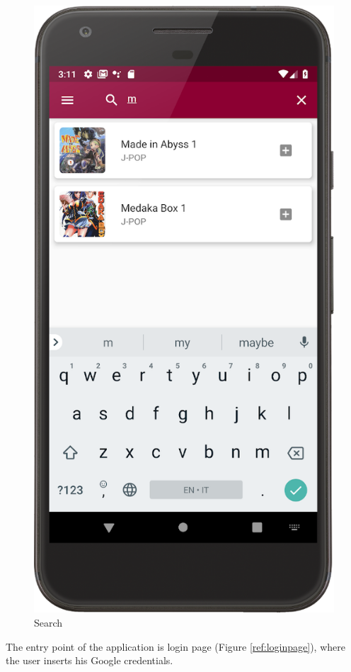 \begin{figure}[!htb]
\begin{minipage}[b]{0.3\textwidth}
        \label{ref:librariespage}
    \end{minipage}
    \hfill
    \begin{minipage}[b]{0.3\textwidth}
        \includegraphics[scale=1]{images/search-page.png}
        \caption{Search}
        \label{ref:search}
    \end{minipage}
\end{figure}
The entry point of the application is login page (Figure \ref{ref:loginpage}), 
where the user inserts his Google credentials.

